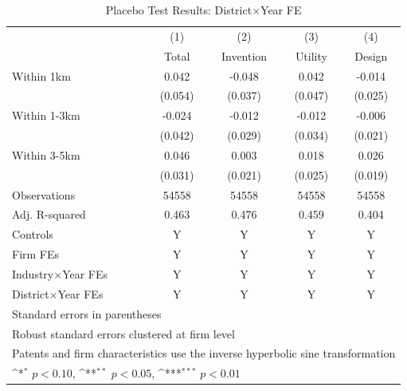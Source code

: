 \begin{table}[!htbp]\centering
\def\sym#1{\ifmmode^{#1}\else\(^{#1}\)\fi}
\caption{Placebo Test Results: District$\times$Year FE}
\label{tab:RBplacebodistrict}
\begin{tabular}{l*{4}{c}}
\toprule
            &\multicolumn{1}{c}{(1)}&\multicolumn{1}{c}{(2)}&\multicolumn{1}{c}{(3)}&\multicolumn{1}{c}{(4)}\\
            &\multicolumn{1}{c}{Total}&\multicolumn{1}{c}{Invention}&\multicolumn{1}{c}{Utility}&\multicolumn{1}{c}{Design}\\
\midrule
Within 1km  &       0.042         &      -0.048         &       0.042         &      -0.014         \\
            &     (0.054)         &     (0.037)         &     (0.047)         &     (0.025)         \\
\addlinespace
Within 1-3km&      -0.024         &      -0.012         &      -0.012         &      -0.006         \\
            &     (0.042)         &     (0.029)         &     (0.034)         &     (0.021)         \\
\addlinespace
Within 3-5km&       0.046         &       0.003         &       0.018         &       0.026         \\
            &     (0.031)         &     (0.021)         &     (0.025)         &     (0.019)         \\
\midrule
Observations&       54558         &       54558         &       54558         &       54558         \\
Adj. R-squared&       0.463         &       0.476         &       0.459         &       0.404         \\
Controls    &           Y         &           Y         &           Y         &           Y         \\
Firm FEs    &           Y         &           Y         &           Y         &           Y         \\
Industry$\times$Year FEs&           Y         &           Y         &           Y         &           Y         \\
District$\times$Year FEs&           Y         &           Y         &           Y         &           Y         \\
\bottomrule
\multicolumn{5}{l}{\footnotesize Standard errors in parentheses}\\
\multicolumn{5}{l}{\footnotesize Robust standard errors clustered at firm level}\\
\multicolumn{5}{l}{\footnotesize Patents and firm characteristics use the inverse hyperbolic sine transformation}\\
\multicolumn{5}{l}{\footnotesize \sym{*} \(p<0.10\), \sym{**} \(p<0.05\), \sym{***} \(p<0.01\)}\\
\end{tabular}
\end{table}